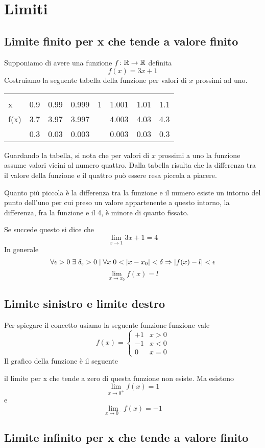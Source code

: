 \chapter{Limiti}
\section{Limite finito per x che tende a valore finito}
Supponiamo di avere una funzione $f\colon \mathbb{R}\to{}\mathbb{R}$ definita \[f(x)=3x+1\] Costruiamo la seguente tabella della funzione per valori di $x$ prossimi ad uno.
\begin{center}
	
\begin{tabular}{@{}Lccccccc}
	\toprule
&&	&&\\
x	& 0.9 & 0.99 & 0.999&1 &1.001  &1.01  & 1.1 \\
\cmidrule(r){2-8} 
f(x)	&3.7  & 3.97 &3.997 & & 4.003 & 4.03 & 4.3 \\ 
\cmidrule(r){2-8} 
& 0.3 &0.03  &0.003  &  & 0.003 &0.03& 0.3 \\ 
\bottomrule
\end{tabular}
\end{center}
Guardando la tabella, si nota che per valori di $x$ prossimi a uno la funzione assume valori vicini al numero quattro. Dalla tabella risulta che la differenza tra il valore della funzione e il quattro può essere resa piccola a piacere.\par Quanto più piccola è la differenza tra la funzione e il numero esiste un intorno del punto dell'uno per cui preso un valore appartenente a questo intorno, la differenza, fra la funzione e il 4,  è minore di quanto fissato. 

Se succede questo si dice che \[\lim_{x\to 1}3x+1=4 \]
In generale \[ \forall \epsilon>0\; \exists\; \delta_\epsilon>0 \; |\; \forall x \; 0<\lvert x-x_0\rvert<\delta \Rightarrow \lvert f(x)-l\rvert<\epsilon \]
 \[\lim_{x\to x_0}f(x)=l \]
 \section{Limite sinistro e limite destro}
 Per spiegare il concetto usiamo la seguente funzione funzione vale \[ f(x)=\begin{cases}
 +1&x>0\\
 -1&x<0\\
 0&x=0
 \end{cases}\]
 Il grafico della funzione è il seguente
  \begin{center}
 	
 \end{center}
il limite per  x che tende a zero di questa funzione non esiste. Ma esistono \[\lim_{x\to 0^+}f(x)=1 \]
e \[\lim_{x\to 0^-}f(x)=-1 \]
\section{Limite infinito per x che tende a valore finito}
